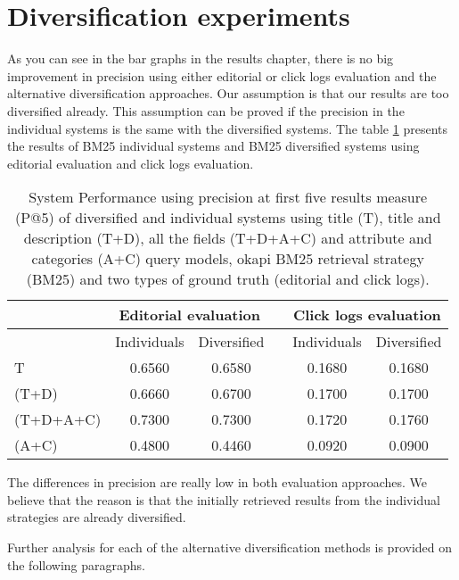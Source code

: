 \section{Diversification experiments}

As you can see in the bar graphs in the results chapter, there is no big improvement in precision using either editorial or click logs evaluation and the alternative diversification approaches. Our assumption is that our results are too diversified already. This assumption can be proved if the precision in the individual systems is the same with the diversified systems. The table \ref{table:MMRP5} presents the results of BM25 individual systems and BM25 diversified systems using editorial evaluation and click logs evaluation.



\begin{table}[H]
\footnotesize
\begin{center}
\caption{System Performance using precision at first five results measure (P@5) of diversified and individual systems using title (T), title and description (T+D), all the fields (T+D+A+C) and attribute and categories (A+C) query models, okapi BM25 retrieval strategy (BM25) and two types of ground truth (editorial and click logs).
}
\label{table:MMRP5}

\begin{tabular}{lccccc}
\toprule
 & \multicolumn{2}{c}{Editorial evaluation} &   & \multicolumn{2}{c}{Click logs evaluation} \\
\midrule
 & Individuals & Diversified &   & Individuals & Diversified \\
\midrule
T & 0.6560 & 0.6580 &   & 0.1680 & 0.1680 \\
(T+D) & 0.6660 & 0.6700 &   & 0.1700 & 0.1700 \\
(T+D+A+C) & 0.7300 & 0.7300 &   & 0.1720 & 0.1760 \\
(A+C) & 0.4800 & 0.4460 &   & 0.0920 & 0.0900 \\
\bottomrule
\end{tabular}
\end{center}
\end{table}


The differences in precision are really low in both evaluation approaches. We believe that the reason is that the initially retrieved results from the individual strategies are already diversified.

Further analysis for each of the alternative diversification methods is provided on the following paragraphs.

